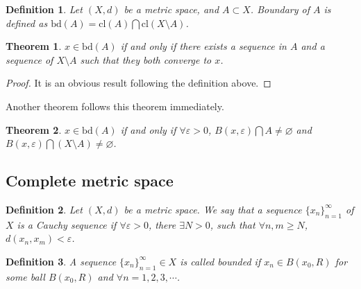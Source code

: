 \documentclass[12pt,leqno]{amsart}
\newtheorem{theorem}{Theorem}[section]
\newtheorem{definition}{Definition}[section]
\theoremstyle{definition}
\begin{document}
\begin{definition}
Let $(X,d)$ be a metric space, and $A\subset X$. Boundary of $A$ is defined as $\text{bd}(A) =  \text{cl}(A)\bigcap  \text{cl}(X\setminus A)$.
\end{definition}

\medskip

\begin{theorem}
$x\in \text{bd}(A)$ if and only if there exists a sequence in $A$ and a sequence of $X\setminus A$ such that they both converge to $x$.
\end{theorem}
\begin{proof}
It is an obvious result following the definition above.
\end{proof}

Another theorem follows this theorem immediately.

\begin{theorem}
$x\in \text{bd}(A)$ if and only if $\forall \varepsilon > 0$, $B(x,\varepsilon)\bigcap A\neq\varnothing$ and $B(x,\varepsilon)\bigcap (X\setminus A)\neq\varnothing$.
\end{theorem}

\medskip

\subsection{Complete metric space}
\begin{definition}
Let $(X,d)$ be a metric space. We say that a sequence $\{x_n\}^\infty_{n=1}$ of $X$ is a Cauchy sequence if $\forall\varepsilon > 0$, there $\exists N > 0$, such that $\forall n,m \geq N$, $d(x_n,x_m) < \varepsilon$.
\end{definition}

\begin{definition}
A sequence $\{x_n\}^\infty_{n=1}\in X$ is called bounded if $x_n\in B(x_0,R)$ for some ball $B(x_0,R)$ and $\forall n = 1,2,3,\cdots$.
\end{definition}

\medskip
\end{document}
